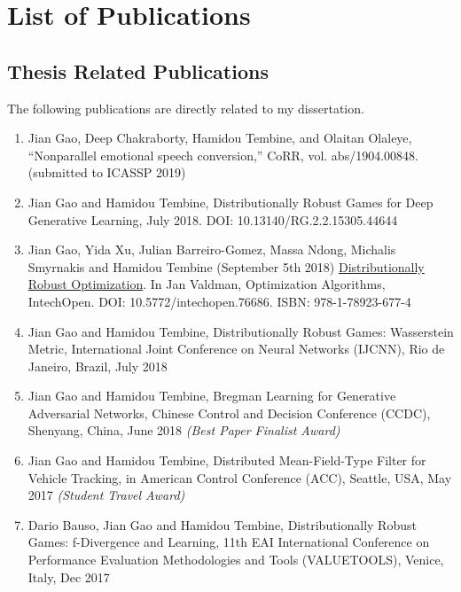 \documentclass{article}
\begin{document}
\clearpage



\section{List of Publications}
\label{Sec:Pub}

\subsection{Thesis Related Publications}
The following publications are directly related to my dissertation.
\begin{enumerate}
\item Jian Gao, Deep Chakraborty, Hamidou Tembine, and Olaitan Olaleye, “Nonparallel emotional speech conversion,” CoRR, vol. abs/1904.00848. (submitted to ICASSP 2019)
\item Jian Gao and Hamidou Tembine, Distributionally Robust Games for Deep Generative Learning, July 2018. DOI: 10.13140/RG.2.2.15305.44644
\item Jian Gao, Yida Xu, Julian Barreiro-Gomez, Massa Ndong, Michalis Smyrnakis and Hamidou Tembine (September 5th 2018) \href{https://www.intechopen.com/books/optimization-algorithms-examples/distributionally-robust-optimization}{Distributionally Robust Optimization}. In Jan Valdman, Optimization Algorithms, IntechOpen. DOI: 10.5772/intechopen.76686. ISBN: 978-1-78923-677-4
\item Jian Gao and Hamidou Tembine, Distributionally Robust Games: Wasserstein Metric, International Joint Conference on Neural Networks (IJCNN), Rio de Janeiro, Brazil, July 2018
\item Jian Gao and Hamidou Tembine, Bregman Learning for Generative Adversarial Networks, Chinese Control and Decision Conference (CCDC), Shenyang, China, June 2018 \textit{(Best Paper Finalist Award)}
\item Jian Gao and Hamidou Tembine, Distributed Mean-Field-Type Filter for Vehicle Tracking, in American Control Conference (ACC), Seattle, USA, May 2017 \textit{(Student Travel Award)}
\item Dario Bauso, Jian Gao and Hamidou Tembine, Distributionally Robust Games: f-Divergence and Learning, 11th EAI International Conference on Performance Evaluation Methodologies and Tools (VALUETOOLS), Venice, Italy, Dec 2017
\end{enumerate}
\end{document}
